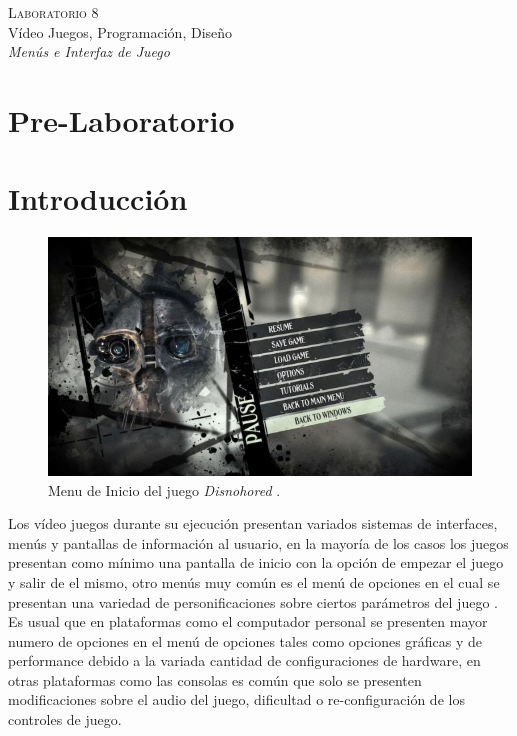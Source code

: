 \begin{center}
\textsc{\Large Laboratorio 8}~\\
{\large Vídeo Juegos, Programación, Diseño}~\\
\emph{Menús e Interfaz de Juego}
\end{center}

\section{Pre-Laboratorio}

\section{Introducción}
\setlength\intextsep{0pt}
\begin{figure}
\includegraphics[width=\linewidth]{semana8/dishonored_menu.jpg} 
\caption{Menu de Inicio del juego \emph{Disnohored} \cite{dishonored}.}
\end{figure}
Los vídeo juegos durante su ejecución presentan variados sistemas de interfaces, menús y pantallas de información al usuario, en la mayoría de los casos los juegos presentan como mínimo una pantalla de inicio con la opción de empezar el juego y salir de el mismo, otro menús muy común es el menú de opciones en el cual se presentan una variedad de personificaciones sobre ciertos parámetros del juego \cite{gb_optionsmenu}. Es usual que en plataformas como el computador personal se presenten mayor numero de opciones en el menú de opciones tales como opciones gráficas y de performance debido a la variada cantidad de configuraciones de hardware, en otras plataformas como las consolas es común que solo se presenten modificaciones sobre el audio del juego, dificultad o re-configuración de los controles de juego.
\newpage
